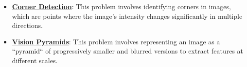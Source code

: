 \documentclass{article}%
\begin{document}
\begin{itemize}[leftmargin=*]
\item \href{https://purdue.brightspace.com/d2l/common/assets/pdfjs-d2l-dist/1.0.14-legacy/web/viewer.html?file=\%2Fcontent\%2Fenforced\%2F1095467-wl.202510.CS.24300.001\%2F08L2-Feature Extraction.pdf\%3Fou\%3D1095467\&lang=en-us\&container=d2l-fileviewer-rendered-pdf\&fullscreen=d2l-fileviewer-rendered-pdf-dialog\&height=667#page=20}{\textbf{Corner Detection}}: This problem involves identifying corners in images, which are points where the image's intensity changes significantly in multiple directions.%
\item \href{https://purdue.brightspace.com/d2l/common/assets/pdfjs-d2l-dist/1.0.14-legacy/web/viewer.html?file=\%2Fcontent\%2Fenforced\%2F1095467-wl.202510.CS.24300.001\%2F08L2-Feature Extraction.pdf\%3Fou\%3D1095467\&lang=en-us\&container=d2l-fileviewer-rendered-pdf\&fullscreen=d2l-fileviewer-rendered-pdf-dialog\&height=667#page=30}{\textbf{Vision Pyramids}}: This problem involves representing an image as a ``pyramid`` of progressively smaller and blurred versions to extract features at different scales.%
\end{itemize}

%
\end{document}
